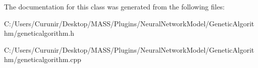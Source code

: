 The documentation for this class was generated from the following files\+:\begin{DoxyCompactItemize}
\item 
C\+:/\+Users/\+Curunir/\+Desktop/\+M\+A\+S\+S/\+Plugins/\+Neural\+Network\+Model/\+Genetic\+Algorithm/geneticalgorithm.\+h\item 
C\+:/\+Users/\+Curunir/\+Desktop/\+M\+A\+S\+S/\+Plugins/\+Neural\+Network\+Model/\+Genetic\+Algorithm/geneticalgorithm.\+cpp\end{DoxyCompactItemize}
